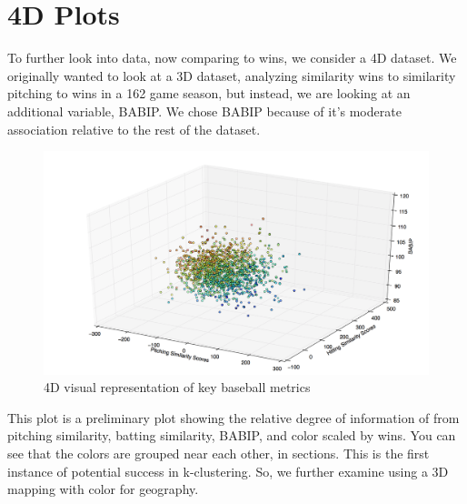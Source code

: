 \documentclass[12pt]{article}
\numberwithin{equation}{subsection}
\begin{document}
\section{4D Plots}
To further look into data, now comparing to wins, we consider a 4D dataset. We originally wanted to look at a 3D dataset, analyzing similarity wins to similarity pitching to wins in a 162 game season, but instead, we are looking at an additional variable, BABIP. We chose BABIP because of it's moderate association relative to the rest of the dataset. 

\begin{figure}[H]
	\centering
    \includegraphics[width=0.9\linewidth]{4d5}
    \caption{4D visual representation of key baseball metrics}
\end{figure}

This plot is a preliminary plot showing the relative degree of information of from pitching similarity, batting similarity, BABIP, and color scaled by wins. You can see that the colors are grouped near each other, in sections. This is the first instance of potential success in k-clustering.  So, we further examine using a 3D mapping with color for geography.
\end{document}
